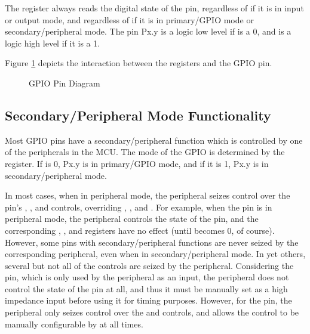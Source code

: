 The  register always reads the digital state of the pin, regardless of if it is in input or output mode, and regardless of if it is in primary/GPIO mode or secondary/peripheral mode. The pin Px.y is a logic low level if  is a 0, and is a logic high level if it is a 1.

Figure \ref{fig:gpio-pin-diagram} depicts the interaction between the registers and the GPIO pin.

\begin{figure}[htpb]
	
	\caption{GPIO Pin Diagram}
	\label{fig:gpio-pin-diagram}
\end{figure}


\subsection{Secondary/Peripheral Mode Functionality}

Most GPIO pins have a secondary/peripheral function which is controlled by one of the peripherals in the MCU. The mode of the GPIO is determined by the  register. If  is 0, Px.y is in primary/GPIO mode, and if it is 1, Px.y is in secondary/peripheral mode.

In most cases, when in peripheral mode, the peripheral seizes control over the pin's , , and  controls, overriding , , and . For example, when the  pin is in peripheral mode, the  peripheral controls the state of the pin, and the corresponding , , and  registers have no effect (until  becomes 0, of course). However, some pins with secondary/peripheral functions are never seized by the corresponding peripheral, even when in secondary/peripheral mode. In yet others, several but not all of the controls are seized by the peripheral. Considering the  pin, which is only used by the  peripheral as an input, the peripheral does not control the state of the pin at all, and thus it must be manually set as a high impedance input before using it for timing purposes. However, for the  pin, the  peripheral only seizes control over the  and  controls, and allows the  control to be manually configurable by  at all times.



